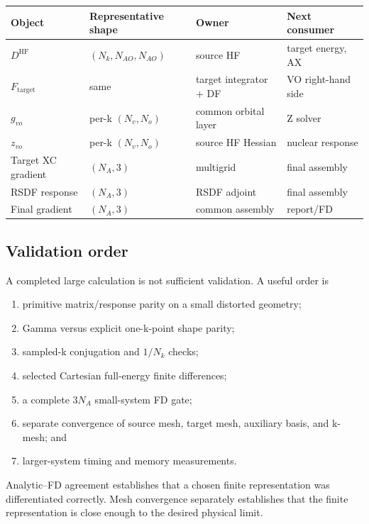 \begin{center}
\begin{longtable}{>{\raggedright\arraybackslash}p{}
                  >{\raggedright\arraybackslash}p{}
                  >{\raggedright\arraybackslash}p{}
                  >{\raggedright\arraybackslash}p{}}
\toprule
Object & Representative shape & Owner & Next consumer \\
\midrule
$D^{\mathrm{HF}}$ & $(N_k,N_{AO},N_{AO})$ & source HF & target energy, AX \\
$F_{\mathrm{target}}$ & same & target integrator + DF & VO right-hand side \\
$g_{vo}$ & per-k $(N_v,N_o)$ & common orbital layer & Z solver \\
$z_{vo}$ & per-k $(N_v,N_o)$ & source HF Hessian & nuclear response \\
Target XC gradient & $(N_A,3)$ & multigrid & final assembly \\
RSDF response & $(N_A,3)$ & RSDF adjoint & final assembly \\
Final gradient & $(N_A,3)$ & common assembly & report/FD \\
\bottomrule
\end{longtable}
\end{center}

\subsection{Validation order}

A completed large calculation is not sufficient validation.  A useful order
is
\begin{enumerate}
  \item primitive matrix/response parity on a small distorted geometry;
  \item Gamma versus explicit one-k-point shape parity;
  \item sampled-k conjugation and $1/N_k$ checks;
  \item selected Cartesian full-energy finite differences;
  \item a complete $3N_A$ small-system FD gate;
  \item separate convergence of source mesh, target mesh, auxiliary basis,
        and k-mesh; and
  \item larger-system timing and memory measurements.
\end{enumerate}

Analytic--FD agreement establishes that a chosen finite representation was
differentiated correctly.  Mesh convergence separately establishes that the
finite representation is close enough to the desired physical limit.

